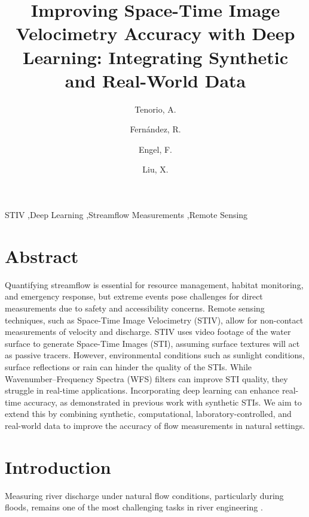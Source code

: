 \documentclass[12pt]{elsarticle}
\begin{document}
\begin{frontmatter}


\title{Improving Space-Time Image Velocimetry Accuracy with Deep Learning: Integrating Synthetic and Real-World Data}

\author[inst1]{Tenorio, A.}
\author[inst1]{Fernández, R.}
\author[inst2]{Engel, F.}
\author[inst1]{Liu, X.}



\begin{keyword}
STIV \sep Deep Learning \sep Streamflow Measurements \sep Remote Sensing
\end{keyword}

\end{frontmatter}

\linenumbers
\section*{Abstract}
Quantifying streamflow is essential for resource management, habitat monitoring, and emergency response, but extreme events pose challenges for direct measurements due to safety and accessibility concerns. Remote sensing techniques, such as Space-Time Image Velocimetry (STIV), allow for non-contact measurements of velocity and discharge. STIV uses video footage of the water surface to generate Space-Time Images (STI), assuming surface textures will act as passive tracers. However, environmental conditions such as sunlight conditions, surface reflections or rain can hinder the quality of the STIs. While Wavenumber–Frequency Spectra (WFS) filters can improve STI quality, they struggle in real-time applications. Incorporating deep learning can enhance real-time accuracy, as demonstrated in previous work with synthetic STIs. We aim to extend this by combining synthetic, computational, laboratory-controlled, and real-world data to improve the accuracy of flow measurements in natural settings.
\section{Introduction}
Measuring river discharge under natural flow conditions, particularly during floods, remains one of the most challenging tasks in river engineering \cite{fujita2019efficient, fujita2007development, muste2008large}. 
\end{document}
